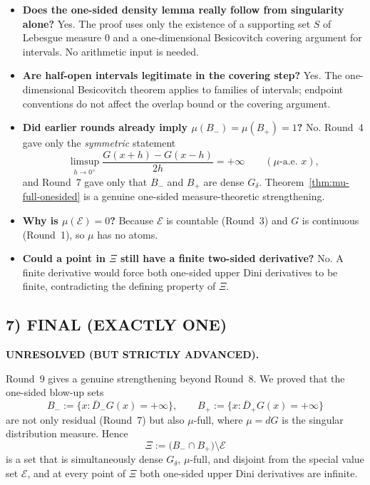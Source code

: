 \begin{itemize}
\item \textbf{Does the one-sided density lemma really follow from singularity alone?}
Yes. The proof uses only the existence of a supporting set $S$ of Lebesgue measure $0$ and a one-dimensional Besicovitch covering argument for intervals. No arithmetic input is needed.

\item \textbf{Are half-open intervals legitimate in the covering step?}
Yes. The one-dimensional Besicovitch theorem applies to families of intervals; endpoint conventions do not affect the overlap bound or the covering argument.

\item \textbf{Did earlier rounds already imply $\mu(B_-)=\mu(B_+)=1$?}
No. Round~4 gave only the \emph{symmetric} statement
\[
\limsup_{h\to0^+}\frac{G(x+h)-G(x-h)}{2h}=+\infty
\qquad(\mu\text{-a.e. }x),
\]
and Round~7 gave only that $B_-$ and $B_+$ are dense $G_\delta$. Theorem~\ref{thm:mu-full-onesided} is a genuine one-sided measure-theoretic strengthening.

\item \textbf{Why is $\mu(\mathcal E)=0$?}
Because $\mathcal E$ is countable (Round~3) and $G$ is continuous (Round~1), so $\mu$ has no atoms.

\item \textbf{Could a point in $\Xi$ still have a finite two-sided derivative?}
No. A finite derivative would force both one-sided upper Dini derivatives to be finite, contradicting the defining property of $\Xi$.
\end{itemize}

\subsection{7) FINAL (EXACTLY ONE)}

\textbf{UNRESOLVED (BUT STRICTLY ADVANCED).}

Round~9 gives a genuine strengthening beyond Round~8. We proved that the one-sided blow-up sets
\[
B_-:=\{x:\overline D_-G(x)=+\infty\},
\qquad
B_+:=\{x:\overline D_+G(x)=+\infty\}
\]
are not only residual (Round~7) but also $\mu$-full, where $\mu=dG$ is the singular distribution measure.
Hence
\[
\Xi:=\bigl(B_-\cap B_+\bigr)\setminus\mathcal E
\]
is a set that is simultaneously dense $G_\delta$, $\mu$-full, and disjoint from the special value set $\mathcal E$, and at every point of $\Xi$ both one-sided upper Dini derivatives are infinite.

